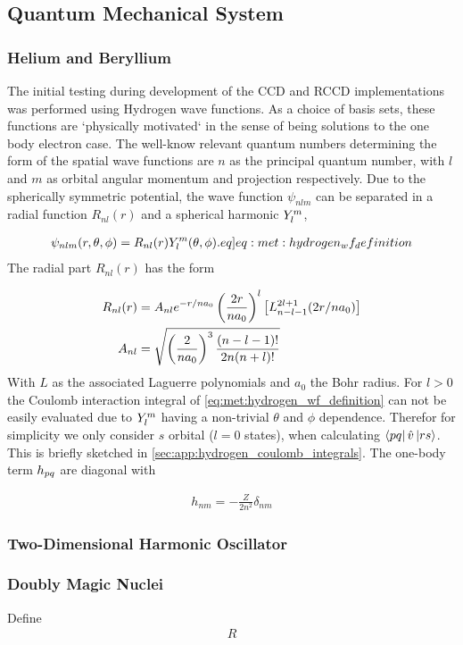 \subsection{Quantum Mechanical System}

\subsubsection{Helium and Beryllium}
The initial testing during development of the CCD and RCCD implementations was performed using Hydrogen wave functions. As a choice of basis sets, these functions are `physically motivated` in the sense of being solutions to the one body electron case. The well-know relevant quantum numbers determining the form of the spatial wave functions are $n$ as the principal quantum number, with $l$ and $m$ as orbital angular momentum and projection respectively. Due to the spherically symmetric potential, the wave function $\psi_{nlm}$ can be separated in a radial function $R_{nl}(r)$ and a spherical harmonic $Y^{m}_{l}$,  

\begin{align}
    \psi_{nlm}(r,\theta,\phi) = R_{nl}(r) \sphericalharmonic{m}{l}(\theta, \phi). \label[eq]{eq:met:hydrogen_wf_definition}
\end{align}
The radial part $R_{nl}(r)$ has the form

\begin{align*}
    R_{nl}(r) &= A_{nl} e^{-r/na_0} \left(\frac{2r}{na_0}\right)^l \left[L^{2l+1}_{n-l-1}(2r/na_0)\right] \\
    A_{nl} &= \sqrt{ \left(\frac{2}{na_0}\right)^3 \frac{(n-l-1)!}{2n(n+l)!} }
\end{align*}
With $L$ as the associated Laguerre polynomials and $a_0$ the Bohr radius. For $l > 0$ the Coulomb interaction integral of \cref{eq:met:hydrogen_wf_definition} can not be easily evaluated due to $Y^{m}_{l}$ having a non-trivial $\theta$ and $\phi$ dependence. Therefor for simplicity we only consider $s$ orbital ($l=0$ states), when calculating $\bra{pq}\hat{v}\ket{rs}$. This is briefly sketched in \cref{sec:app:hydrogen_coulomb_integrals}. The one-body term $h_{pq}$ are diagonal with 

\begin{align}
    h_{nm} = -\frac{Z}{2n^2}\delta_{nm} 
\end{align}

\subsubsection{Two-Dimensional Harmonic Oscillator}
\subsubsection{Doubly Magic Nuclei}
Define
\begin{align}
    R
\end{align}